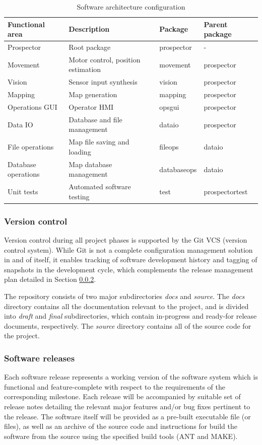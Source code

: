 \documentclass[12pt]{article}
\begin{document}
\begin{table}
\begin{tabular}{ | p{} | p{}| p{} |p{}|}
\hline
\textbf{Functional area} & \textbf{Description} &  \textbf{Package} &  \textbf{Parent package}\\
\hline
Prospector & Root package & prospector & - \\
\hline
Movement & Motor control, position estimation & movement & prospector \\
\hline
Vision & Sensor input synthesis & vision & prospector \\
\hline
Mapping & Map generation & mapping & prospector \\
\hline
Operations GUI & Operator HMI & opsgui & prospector \\
\hline
Data IO & Database and file management & dataio & prospector \\
\hline
File operations & Map file saving and loading & fileops & dataio \\
\hline
Database operations & Map database management & databaseops & dataio \\
\hline
Unit tests & Automated software testing & test & prospectortest \\
\hline
\end{tabular}
\caption{Software architecture configuration}
\label{table:architecture}
\end{table}

\subsubsection{Version control}
Version control during all project phases is supported by the Git VCS (version control system). While Git is not a complete configuration management solution in and of itself, it enables tracking of software development history and tagging of snapshots in the development cycle, which complements the release management plan detailed in Section \ref{releases}.

The repository consists of two major subdirectories \textit{docs} and \textit{source}. The \textit{docs} directory contains all the documentation relevant to the project, and is divided into \textit{draft} and \textit{final} subdirectories, which contain in-progress and ready-for release documents, respectively. The \textit{source} directory contains all of the source code for the project.

\subsubsection{Software releases}\label{releases}
Each software release represents a working version of the software system which is functional and feature-complete with respect to the requirements of the corresponding milestone. Each release will be accompanied by suitable set of release notes detailing the relevant major features and/or bug fixes pertinent to the release. The software itself will be provided as a pre-built executable file (or files), as well as an archive of the source code and instructions for build the software from the source using the specified build tools (ANT and MAKE).
\end{document}
